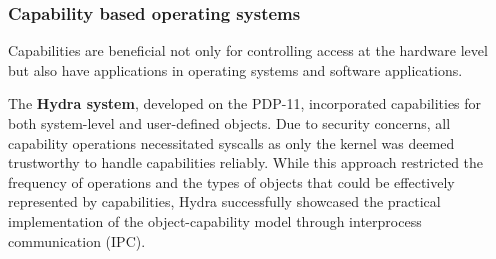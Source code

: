 \subsubsection{Capability based operating systems}
Capabilities are beneficial not only for controlling access at the hardware level but also 
have applications in operating systems and software applications.
\newline

The \textbf{Hydra system}, developed on the PDP-11, incorporated capabilities for both system-level 
and user-defined objects. Due to security concerns, all capability operations necessitated 
syscalls as only the kernel was deemed trustworthy to handle capabilities reliably. While 
this approach restricted the frequency of operations and the types of objects that 
could be effectively represented by capabilities, Hydra successfully showcased the 
practical implementation of the object-capability model through interprocess communication (IPC).
\newline

